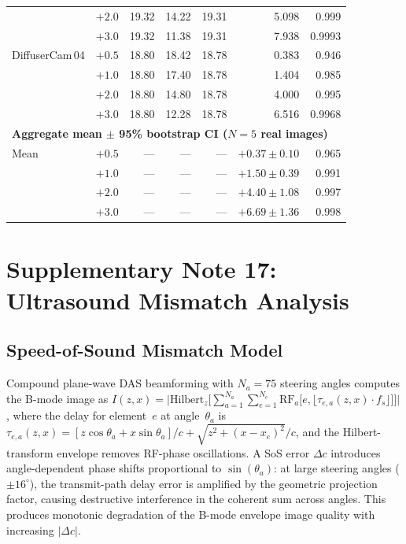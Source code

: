 \documentclass[11pt]{article}
\begin{document}
\begin{table}[htbp]
\begin{tabular}{l r r r r r r}
                & $+2.0$ & 19.32 & 14.22 & 19.31 & 5.098 & 0.999 \\
                & $+3.0$ & 19.32 & 11.38 & 19.31 & 7.938 & 0.9993 \\
DiffuserCam\,04 & $+0.5$ & 18.80 & 18.42 & 18.78 & 0.383 & 0.946 \\
                & $+1.0$ & 18.80 & 17.40 & 18.78 & 1.404 & 0.985 \\
                & $+2.0$ & 18.80 & 14.80 & 18.78 & 4.000 & 0.995 \\
                & $+3.0$ & 18.80 & 12.28 & 18.78 & 6.516 & 0.9968 \\
\midrule
\multicolumn{7}{l}{\textbf{Aggregate mean $\pm$ 95\% bootstrap CI ($N{=}5$ real images)}} \\
\midrule
Mean & $+0.5$ & --- & --- & --- & $+0.37 \pm 0.10$ & 0.965 \\
     & $+1.0$ & --- & --- & --- & $+1.50 \pm 0.39$ & 0.991 \\
     & $+2.0$ & --- & --- & --- & $+4.40 \pm 1.08$ & 0.997 \\
     & $+3.0$ & --- & --- & --- & $+6.69 \pm 1.36$ & 0.998 \\
\bottomrule
\end{tabular}
\end{table}



\section{Supplementary Note 17: Ultrasound Mismatch Analysis}
\label{sec:note_ultrasound}

\subsection{Speed-of-Sound Mismatch Model}
Compound plane-wave DAS beamforming with $N_a{=}75$ steering angles computes the B-mode image as $I(z,x) = \bigl|\mathrm{Hilbert}_z\bigl[\sum_{a=1}^{N_a}\sum_{e=1}^{N_e} \mathrm{RF}_a\bigl[e, \lfloor\tau_{e,a}(z,x)\cdot f_s\rfloor\bigr]\bigr]\bigr|$, where the delay for element~$e$ at angle~$\theta_a$ is $\tau_{e,a}(z,x) = [z\cos\theta_a + x\sin\theta_a]/c + \sqrt{z^2 + (x - x_e)^2}/c$, and the Hilbert-transform envelope removes RF-phase oscillations.
A SoS error $\Delta c$ introduces angle-dependent phase shifts proportional to $\sin(\theta_a)$: at large steering angles ($\pm 16^\circ$), the transmit-path delay error is amplified by the geometric projection factor, causing destructive interference in the coherent sum across angles. This produces monotonic degradation of the B-mode envelope image quality with increasing $|\Delta c|$.
\end{document}

